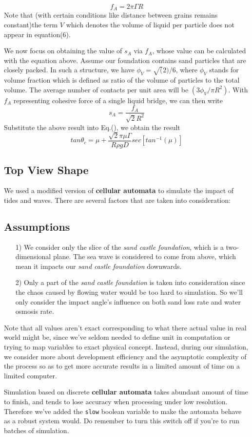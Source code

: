 \documentclass[12pt]{article}
\begin{document}
$$f_A = 2\pi \Gamma R$$
Note that (with certain conditions like distance between grains remains constant)the term $V$ which denotes the volume of liquid per particle does not appear in equation(6).
\par
We now focus on obtaining the value of $s_A$ via $f_A$, whose value can be calculated with the equation above. Assume our foundation contains sand particles that are closely packed. In such a structure, we have $\phi_V = \sqrt(2)/6$, where $\phi_V$ stands for volume fraction which is defined as ratio of the volume of particles to the total volume. The average number of contacts per unit area will be $(3\phi_V/\pi R^2)$. With $f_A$ representing cohesive force of a single liquid bridge, we can then write
$$ s_A = \frac{f_A}{\sqrt{2}R^2}$$
Substitute the above result into Eq.(), we obtain the result
$$ tan\theta_c = \mu + \frac{\sqrt{2}\pi\mu\Gamma}{R\rho gD}sec[tan^{-1}(\mu)] $$

\subsection{Top View Shape}
\newenvironment{longlisting}{\captionsetup{type=listing}}{}

\par
We used a modified version of\textbf{ cellular automata} to simulate the impact of tides and waves. There are several factors that are taken into consideration:
\par
\subsection{Assumptions}
\begin{itemize}
    \item [1)]
          We consider only the slice of the \textit{sand castle foundation}, which is a two-dimensional plane. The sea wave is considered to come from above, which mean it impacts our \textit{sand castle foundation} downwards.
    \item [2)]
          Only a part of the \textit{sand castle foundation} is taken into consideration since the chaos caused by flowing water would be too hard to simulation. So we'll only consider the impact angle's influence on both sand loss rate and water osmosis rate.
\end{itemize}

Note that all values aren't exact corresponding to what there actual value in real world might be, since we've seldom needed to define unit in computation or trying to map variables to exact physical concept. Instead, during our simulation, we consider more about development efficiency and the asymptotic complexity of the process so as to get more accurate results in a limited amount of time on a limited computer.
\par
Simulation based on discrete \textbf{cellular automata} takes abundant amount of time to finish, and tends to lose accuracy when processing under low resolution. Therefore we've added the \texttt{slow} boolean variable to make the automata behave as a robust system would. Do remember to turn this switch off if you're to run batches of simulation.
\end{document}
